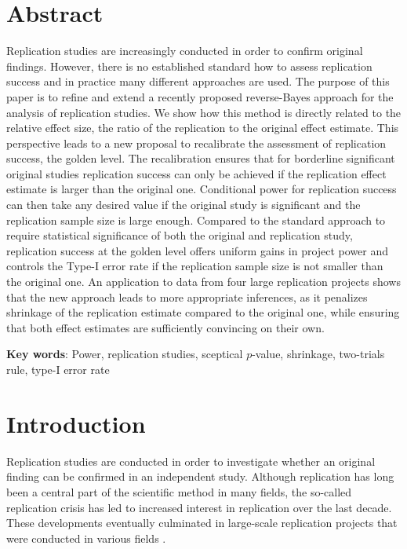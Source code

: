\section*{Abstract}
Replication studies are increasingly conducted in order to confirm original
findings. However, there is no established standard how to assess replication
success and in practice many different approaches are used. The purpose of this
paper is to refine and extend a recently proposed reverse-Bayes approach for the
analysis of replication studies. We show how this method is directly related to
the relative effect size, the ratio of the replication to the original effect
estimate. This perspective leads to a new proposal to recalibrate the assessment
of replication success, the golden level. The recalibration ensures that for
borderline significant original studies replication success can only be achieved
if the replication effect estimate is larger than the original one. Conditional
power for replication success can then take any desired value if the original
study is significant and the replication sample size is large enough. Compared
to the standard approach to require statistical significance of both the
original and replication study, replication success at the golden level offers
uniform gains in project power and controls the Type-I error rate if the
replication sample size is not smaller than the original one. An application to
data from four large replication projects shows that the new approach leads to
more appropriate inferences, as it penalizes shrinkage of the replication
estimate compared to the original one, while ensuring that both effect estimates
are sufficiently convincing on their own.

\textbf{Key words}: Power, replication studies, sceptical $p$-value, shrinkage,
two-trials rule, type-I error rate

\section{Introduction}
Replication studies are conducted in order to investigate whether an original
finding can be confirmed in an independent study. Although replication has long
been a central part of the scientific method in many fields, the so-called
replication crisis \citep{Ioannidis2005, Begley2015} has led to increased
interest in replication over the last decade. These developments eventually
culminated in large-scale replication projects that were conducted in various
fields \citep{Errington2014, Klein2014, Opensc2015, Ebersole2016, Camerer2016,
  Camerer2018, Cova2018, Klein2018}.

